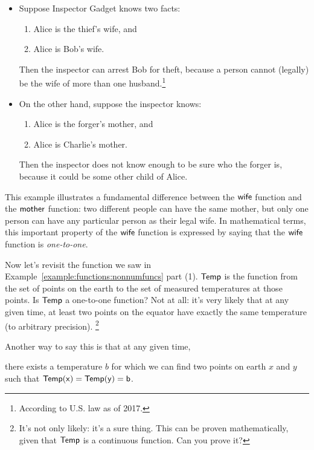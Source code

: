 \begin{example}{} 
\begin{itemize}
\item Suppose Inspector Gadget knows two facts:
\begin{enumerate}
\item Alice is the thief's wife,
and
\item Alice is Bob's wife.
\end{enumerate}
Then the inspector can arrest Bob for theft,
because a person cannot (legally) be the wife of more than one husband.\footnote{According to U.S. law as of 2017.}

\item On the other hand, suppose the inspector knows:
\begin{enumerate}
\item Alice is the forger's mother,
and
\item Alice is Charlie's mother.
\end{enumerate}
Then the inspector does not know enough to be sure who the forger is,
because it could be some other child of Alice.
\end{itemize}
This example illustrates a fundamental difference between the $\sf{wife}$ function and the $\sf{mother}$ function: two different people can have the same mother, but only one person can have any particular person as their legal wife. 
In mathematical terms, this important property of the $\sf{wife}$ function is expressed by saying that the $\sf{wife}$ function is  \emph{one-to-one}.
\end{example}

\begin{example}{}
Now let's revisit the function we saw in Example~\ref{example:functions:nonnumfuncs} part (1).  $\sf{Temp}$ is the function from the set of points on the earth to the set of measured temperatures at those points.  Is $\sf{Temp}$ a one-to-one function?  Not at all: it's very likely that at any given time, at least two points on the equator have exactly the same temperature (to arbitrary precision).  
\footnote{It's not only likely: it's a sure thing. This can be proven mathematically, given that $\sf{Temp}$ is a continuous function.  Can you prove it?}

Another way to say this is that at any given time, 

\begin{center}
there exists a temperature $b$ for which we can find two points on earth $x$ and $y$ such that  $\sf{Temp}(x) = \sf{Temp}(y) = b$.
\end{center}
\end{example}

